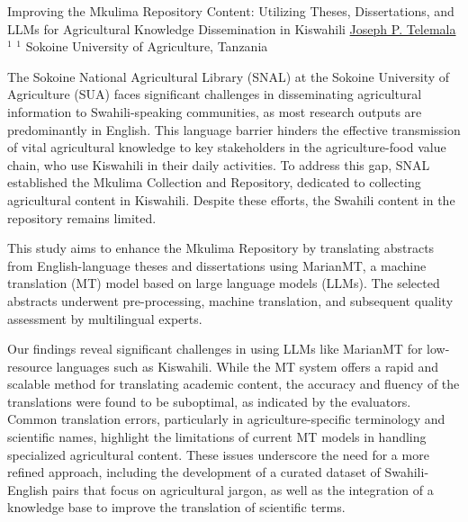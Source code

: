 \begin{abstract_online}{Improving the Mkulima Repository Content: Utilizing Theses, Dissertations, and LLMs for Agricultural Knowledge Dissemination in Kiswahili}{%
    \underline{Joseph P. Telemala}$^{1}${%
    }{%
    $^1$ Sokoine University of Agriculture, Tanzania}
}

The Sokoine National Agricultural Library (SNAL) at the Sokoine University of Agriculture (SUA) faces significant challenges in disseminating agricultural information to Swahili-speaking communities, as most research outputs are predominantly in English. This language barrier hinders the effective transmission of vital agricultural knowledge to key stakeholders in the agriculture-food value chain, who use Kiswahili in their daily activities. To address this gap, SNAL established the Mkulima Collection and Repository, dedicated to collecting agricultural content in Kiswahili. Despite these efforts, the Swahili content in the repository remains limited.

This study aims to enhance the Mkulima Repository by translating abstracts from English-language theses and dissertations using MarianMT, a machine translation (MT) model based on large language models (LLMs). The selected abstracts underwent pre-processing, machine translation, and subsequent quality assessment by multilingual experts.

Our findings reveal significant challenges in using LLMs like MarianMT for low-resource languages such as Kiswahili. While the MT system offers a rapid and scalable method for translating academic content, the accuracy and fluency of the translations were found to be suboptimal, as indicated by the evaluators. Common translation errors, particularly in agriculture-specific terminology and scientific names, highlight the limitations of current MT models in handling specialized agricultural content. These issues underscore the need for a more refined approach, including the development of a curated dataset of Swahili-English pairs that focus on agricultural jargon, as well as the integration of a knowledge base to improve the translation of scientific terms.

\end{abstract_online}

